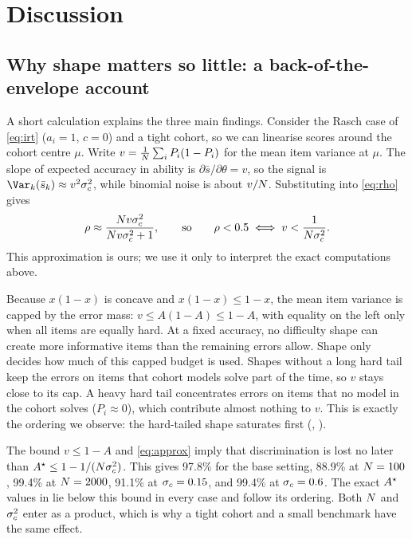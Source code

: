 \section{Discussion}
\label{sec:discussion}

\subsection{Why shape matters so little: a back-of-the-envelope account}
\label{sec:mechanism}

A short calculation explains the three main findings. Consider the Rasch case of \eqref{eq:irt} ($a_i = 1$, $c = 0$) and a tight cohort, so we can linearise scores around the cohort centre $\mu$. Write $v = \frac{1}{N}\sum_i P_i(1-P_i)$ for the mean item variance at $\mu$. The slope of expected accuracy in ability is $\partial \bar{s}/\partial\theta = v$, so the signal is $\Var_k(\bar{s}_k) \approx v^2 \sigc^2$, while binomial noise is about $v/N$. Substituting into \eqref{eq:rho} gives
\begin{equation}
\rho \approx \frac{N v \sigma_{c}^2}{N v \sigma_{c}^2 + 1}, \qquad\text{so}\qquad \rho < 0.5 \iff v < \frac{1}{N\sigma_{c}^2}.
\label{eq:approx}
\end{equation}
This approximation is ours; we use it only to interpret the exact computations above.

 Because $x(1-x)$ is concave and $x(1-x) \le 1-x$, the mean item variance is capped by the error mass: $v \le A(1-A) \le 1 - A$, with equality on the left only when all items are equally hard. At a fixed accuracy, no difficulty shape can create more informative items than the remaining errors allow. Shape only decides how much of this capped budget is used. Shapes without a long hard tail keep the errors on items that cohort models solve part of the time, so $v$ stays close to its cap. A heavy hard tail concentrates errors on items that no model in the cohort solves ($P_i \approx 0$), which contribute almost nothing to $v$. This is exactly the ordering we observe: the hard-tailed shape saturates first (, ).

 The bound $v \le 1-A$ and \eqref{eq:approx} imply that discrimination is lost no later than $A^{\star} \le 1 - 1/(N\sigma_{c}^2)$. This gives 97.8\% for the base setting, 88.9\% at $N = 100$, 99.4\% at $N = 2000$, 91.1\% at $\sigma_{c} = 0.15$, and 99.4\% at $\sigma_{c} = 0.6$. The exact $A^{\star}$ values in  lie below this bound in every case and follow its ordering. Both $N$ and $\sigma_{c}^2$ enter as a product, which is why a tight cohort and a small benchmark have the same effect.

